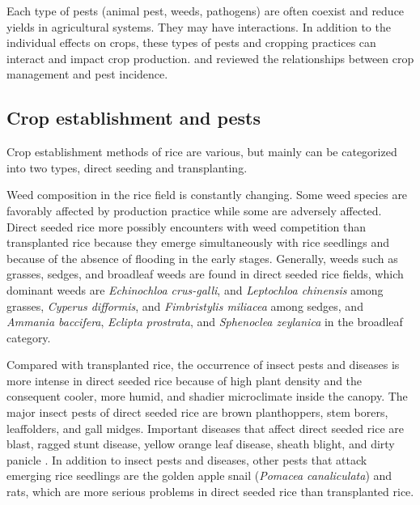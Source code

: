 \documentclass[12pt, oneside]{report}
\begin{document}
Each type of pests (animal pest, weeds, pathogens) are  often coexist and reduce yields in agricultural systems. They may have interactions. In addition to the individual effects on crops, these types of pests and cropping practices can interact and impact crop production. \cite{ouricedisease, ho1994weed, cohen1998importance} and \cite{Mew:2004kh} reviewed the relationships between crop management and pest incidence. 

\subsection*{Crop establishment and pests}

Crop establishment methods of rice are various, but mainly can be categorized into two types, direct seeding and transplanting. 

Weed composition in the rice field is constantly changing. Some weed species are favorably affected by production practice while some are adversely affected. Direct seeded rice more possibly encounters with weed competition than transplanted rice because they emerge simultaneously with rice seedlings and because of the absence of flooding in the early stages. Generally, weeds such as grasses, sedges, and broadleaf weeds are found in direct seeded rice fields, which dominant weeds are \textit{Echinochloa crus-galli}, and \textit{Leptochloa chinensis} among grasses, \textit{Cyperus difformis}, and \textit{Fimbristylis miliacea} among sedges, and \textit{Ammania baccifera}, \textit{Eclipta prostrata}, and \textit{Sphenoclea zeylanica} in the broadleaf category. 

Compared with transplanted rice, the occurrence of insect pests and diseases is more intense in direct seeded rice because of high plant density and the consequent cooler, more humid, and shadier microclimate inside the canopy. The major insect pests of direct seeded rice are brown planthoppers, stem borers, leaffolders, and gall midges. Important diseases that affect direct seeded rice are blast, ragged stunt disease, yellow orange leaf disease, sheath blight, and dirty panicle \citep{pongprasert1995insect}. In addition to insect pests and diseases, other pests that attack emerging rice seedlings are the golden apple snail (\textit{Pomacea canaliculata}) and rats, which are more serious problems in direct seeded rice than transplanted rice.
\end{document}
